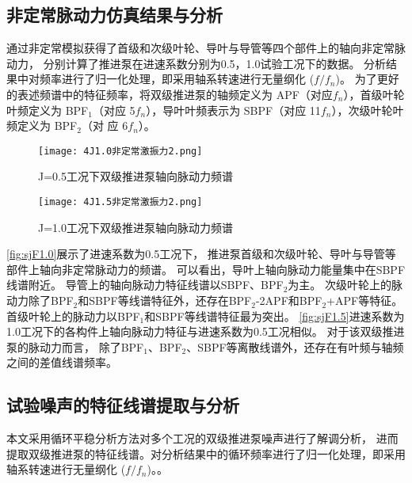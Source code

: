 \subsection{非定常脉动力仿真结果与分析}
通过非定常模拟获得了首级和次级叶轮、导叶与导管等四个部件上的轴向非定常脉动力，
分别计算了推进泵在进速系数分别为0.5，1.0试验工况下的数据。
分析结果中对频率进行了归一化处理，即采用轴系转速进行无量纲化 ($f/f_n$)。
为了更好的表述频谱中的特征频率，将双级推进泵的轴频定义为 APF（对应$f_n$），首级叶轮叶频定义为
BPF$_1$（对应 5$f_n$），导叶叶频表示为 SBPF（对应 11$f_n$），次级叶轮叶频定义为 BPF$_2$（对
应 6$f_n$）。
\begin{comment}
\begin{figure}[htbp]
    \centering
    \texttt{[image: 4J0.5非定常激振力1.png]}
    \caption{\label{fig:sjF0.5}J=0.5工况下双级推进泵轴向脉动力频谱}
\end{figure}
\end{comment}
\begin{figure}[htbp]
    \centering
    \texttt{[image: 4J1.0非定常激振力2.png]}
    \caption{\label{fig:sjF1.0}J=0.5工况下双级推进泵轴向脉动力频谱}
\end{figure}

\begin{figure}[htbp]
    \centering
    \texttt{[image: 4J1.5非定常激振力2.png]}
    \caption{\label{fig:sjF1.5}J=1.0工况下双级推进泵轴向脉动力频谱}
\end{figure}

\autoref{fig:sjF1.0}展示了进速系数为0.5工况下，
推进泵首级和次级叶轮、导叶与导管等部件上轴向非定常脉动力的频谱。
可以看出，导叶上轴向脉动力能量集中在SBPF线谱附近。
导管上的轴向脉动力特征线谱以SBPF、BPF$_2$为主。
次级叶轮上的脉动力除了BPF$_2$和SBPF等线谱特征外，还存在BPF$_2$-2APF和BPF$_2$+APF等特征。
首级叶轮上的脉动力以BPF$_1$和SBPF等线谱特征最为突出。
\autoref{fig:sjF1.5}进速系数为1.0工况下的各构件上轴向脉动力特征与进速系数为0.5工况相似。
对于该双级推进泵的脉动力而言，
除了BPF$_1$、BPF$_2$、SBPF等离散线谱外，还存在有叶频与轴频之间的差值线谱频率。

\subsection{试验噪声的特征线谱提取与分析}
本文采用循环平稳分析方法对多个工况的双级推进泵噪声进行了解调分析，
进而提取双级推进泵的特征线谱。对分析结果中的循环频率进行了归一化处理，即采用轴系转速进行无量纲化 ($f/f_n$)。。

